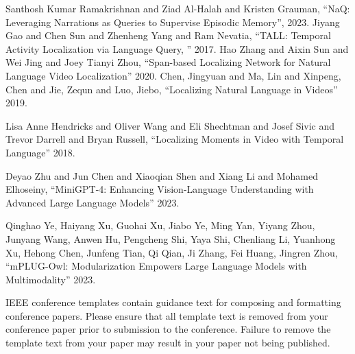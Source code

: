 \documentclass[conference]{IEEEtran}
\begin{document}
\begin{thebibliography}{00}
 Santhosh Kumar Ramakrishnan and Ziad Al-Halah and Kristen Grauman, ``NaQ: Leveraging Narrations as Queries to Supervise Episodic Memory'', 2023.
 Jiyang Gao and Chen Sun and Zhenheng Yang and Ram Nevatia, ``TALL: Temporal Activity Localization via Language Query, '' 2017.
 Hao Zhang and Aixin Sun and Wei Jing and Joey Tianyi Zhou, ``Span-based Localizing Network for Natural Language Video Localization'' 2020.
 Chen, Jingyuan and Ma, Lin and Xinpeng, Chen and Jie, Zequn and Luo, Jiebo, ``Localizing Natural Language in Videos'' 2019.

 Lisa Anne Hendricks and Oliver Wang and Eli Shechtman and Josef Sivic and Trevor Darrell and Bryan Russell, ``Localizing Moments in Video with Temporal Language'' 2018.

 Deyao Zhu and Jun Chen and Xiaoqian Shen and Xiang Li and Mohamed Elhoseiny, ``MiniGPT-4: Enhancing Vision-Language Understanding with Advanced Large Language Models'' 2023.

 Qinghao Ye, Haiyang Xu, Guohai Xu, Jiabo Ye, Ming Yan, Yiyang Zhou, Junyang Wang, Anwen Hu, Pengcheng Shi, Yaya Shi, Chenliang Li, Yuanhong Xu, Hehong Chen, Junfeng Tian, Qi Qian, Ji Zhang, Fei Huang, Jingren Zhou, ``mPLUG-Owl: Modularization Empowers Large Language Models with Multimodality'' 2023.



\end{thebibliography}
\vspace{12pt}
\color{red}
IEEE conference templates contain guidance text for composing and formatting conference papers. Please ensure that all template text is removed from your conference paper prior to submission to the conference. Failure to remove the template text from your paper may result in your paper not being published.
\end{document}
